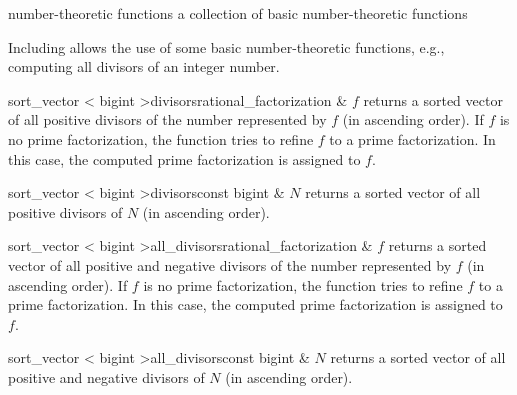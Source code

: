 

\NAME

number-theoretic functions \dotfill a collection of basic number-theoretic functions



\ABSTRACT

Including  allows the use of some basic number-theoretic
functions, e.g., computing all divisors of an integer number.



\DESCRIPTION

\begin{fcode}{sort_vector < bigint >}{divisors}{rational_factorization & $f$}
  returns a sorted vector of all positive divisors of the number represented by $f$ (in
  ascending order).  If $f$ is no prime factorization, the function tries to refine $f$ to a
  prime factorization.  In this case, the computed prime factorization is assigned to $f$.
\end{fcode}

\begin{fcode}{sort_vector < bigint >}{divisors}{const bigint & $N$}
  returns a sorted vector of all positive divisors of $N$ (in ascending order).
\end{fcode}

\begin{fcode}{sort_vector < bigint >}{all_divisors}{rational_factorization & $f$}
  returns a sorted vector of all positive and negative divisors of the number represented by $f$
  (in ascending order).  If $f$ is no prime factorization, the function tries to refine $f$ to a
  prime factorization.  In this case, the computed prime factorization is assigned to $f$.
\end{fcode}

\begin{fcode}{sort_vector < bigint >}{all_divisors}{const bigint & $N$}
  returns a sorted vector of all positive and negative divisors of $N$ (in ascending order).
\end{fcode}

